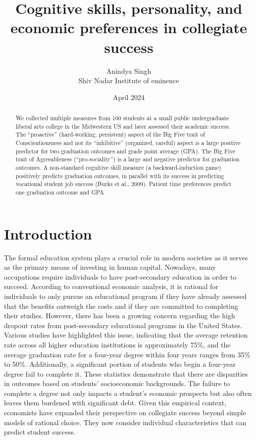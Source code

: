 \documentclass[12pt,a4paper]{article}
\title{Cognitive skills, personality, and economic preferences in collegiate success}
\author{Anindya Singh \\ \large Shiv Nadar Institute of eminence}
\date{April 2024}
\begin{document}
\maketitle

\newpage
\begin{abstract}
    We collected multiple measures from 100 students at a small public undergraduate liberal
arts college in the Midwestern US and later assessed their academic success. The “proactive” (hard-working, persistent) aspect of the Big Five trait of Conscientiousness and not its
“inhibitive” (organized, careful) aspect is a large positive predictor for two graduation outcomes and grade point average (GPA). The Big Five trait of Agreeableness (“pro-sociality”)
is a large and negative predictor for graduation outcomes. A non-standard cognitive skill
measure (a backward-induction game) positively predicts graduation outcomes, in parallel
with its success in predicting vocational student job success (Burks et al., 2009). Patient
time preferences predict one graduation outcome and GPA
\end{abstract}
\newpage
\section{Introduction}
The formal education system plays a crucial role in modern societies as it serves as the primary means of investing in human capital. Nowadays, many occupations require individuals to have post-secondary education in order to succeed. According to conventional economic analysis, it is rational for individuals to only pursue an educational program if they have already assessed that the benefits outweigh the costs and if they are committed to completing their studies. However, there has been a growing concern regarding the high dropout rates from post-secondary educational programs in the United States. Various studies have highlighted this issue, indicating that the average retention rate across all higher education institutions is approximately 75\%, and the average graduation rate for a four-year degree within four years ranges from 35\% to 50\%. Additionally, a significant portion of students who begin a four-year degree fail to complete it. These statistics demonstrate that there are disparities in outcomes based on students' socioeconomic backgrounds. The failure to complete a degree not only impacts a student's economic prospects but also often leaves them burdened with significant debt. Given this empirical context, economists have expanded their perspective on collegiate success beyond simple models of rational choice. They now consider individual characteristics that can predict student success.
\end{document}
